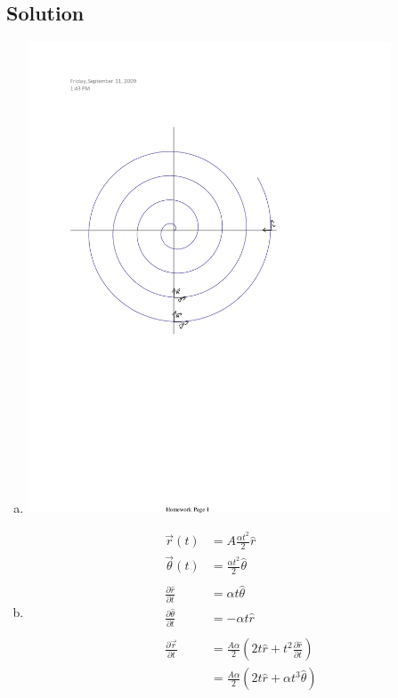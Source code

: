 \documentclass[solutions]{esg8012pset}
\begin{document}
\subsection{Solution}
  \begin{enumerate}[a.]
    \item \includegraphics[width=0.85\textwidth]{ps01_Diagram_3}
    \item \begin{align*}
            \vec r(t) & = A\frac{\alpha t^2}{2} \hat r \\
            \vec \theta(t) & = \frac{\alpha t^2}{2} \hat\theta \\
            \\
            \frac{\partial \hat r}{\partial t} & = \alpha t \hat \theta \\
            \frac{\partial \hat \theta}{\partial t} & = -\alpha t \hat r \\
            \\
            \frac{\partial \vec r}{\partial t} & = \frac{A\alpha}{2}\left( 2t\hat r + t^2\frac{\partial \hat r}{\partial t}\right) \\
            & = \frac{A\alpha}{2}\left( 2t\hat r + \alpha t^3 \hat \theta\right) \\

\end{align*}
\end{enumerate}
\end{document}
